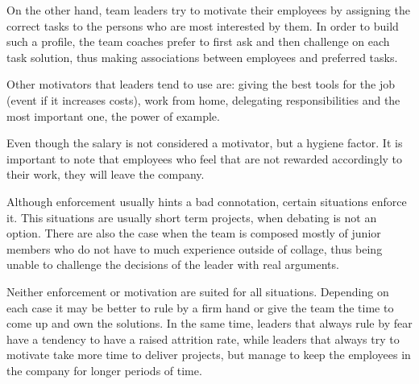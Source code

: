 On the other hand, team leaders try to motivate their employees by assigning the correct tasks to the persons who are most interested by them. In order to build such a profile, the team coaches prefer to first ask and then challenge on each task solution, thus making associations between employees and preferred tasks.

Other motivators that leaders tend to use are: giving the best tools for the job (event if it increases costs), work from home, delegating responsibilities and the most important one, the power of example.

Even though the salary is not considered a motivator, but a hygiene factor. It is important to note that employees who feel that are not rewarded accordingly to their work, they will leave the company. 

Although enforcement usually hints a bad connotation, certain situations enforce it. This situations are usually short term projects, when debating is not an option. There are also the case when the team is composed mostly of junior members who do not have to much experience outside of collage, thus being unable to challenge the decisions of the leader with real arguments. 

Neither enforcement or motivation are suited for all situations. Depending on each case it may be better to rule by a firm hand or give the team the time to come up and own the solutions. In the same time, leaders that always rule by fear have a tendency to have a raised attrition rate, while leaders that always try to motivate take more time to deliver projects, but manage to keep the employees in the company for longer periods of time.